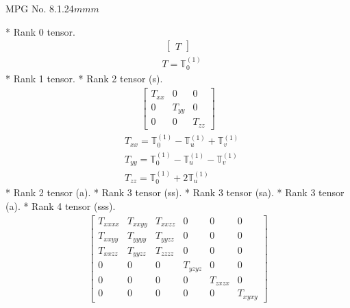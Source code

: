 \documentclass[fleqn,8pt,landscape]{jsarticle}
\begin{document}
\setcounter{MaxMatrixCols}{32}

\renewcommand{\tablename}{Table~}
\renewcommand{\figurename}{Figure~}
\begin{center}
\LARGE
MPG No. 8.1.24\quad$mmm$
\end{center}
* Rank 0 tensor.
\begin{align*}
\begin{bmatrix} T \end{bmatrix}
\end{align*}
\begin{align*}
& T = \mathbb{T}_{0}^{(1)}
\end{align*}
* Rank 1 tensor.
* Rank 2 tensor (s).
\begin{align*}
\begin{bmatrix} T_{xx} & 0 & 0 \\ 0 & T_{yy} & 0 \\ 0 & 0 & T_{zz} \end{bmatrix}
\end{align*}
\begin{align*}
& T_{xx} = \mathbb{T}_{0}^{(1)} - \mathbb{T}_{u}^{(1)} + \mathbb{T}_{v}^{(1)} \\
& T_{yy} = \mathbb{T}_{0}^{(1)} - \mathbb{T}_{u}^{(1)} - \mathbb{T}_{v}^{(1)} \\
& T_{zz} = \mathbb{T}_{0}^{(1)} + 2 \mathbb{T}_{u}^{(1)}
\end{align*}
* Rank 2 tensor (a).
* Rank 3 tensor (ss).
* Rank 3 tensor (sa).
* Rank 3 tensor (a).
* Rank 4 tensor (sss).
\begin{align*}
\begin{bmatrix} T_{xxxx} & T_{xxyy} & T_{xxzz} & 0 & 0 & 0 \\ T_{xxyy} & T_{yyyy} & T_{yyzz} & 0 & 0 & 0 \\ T_{xxzz} & T_{yyzz} & T_{zzzz} & 0 & 0 & 0 \\ 0 & 0 & 0 & T_{yzyz} & 0 & 0 \\ 0 & 0 & 0 & 0 & T_{zxzx} & 0 \\ 0 & 0 & 0 & 0 & 0 & T_{xyxy} \end{bmatrix}
\end{align*}
\end{document}
